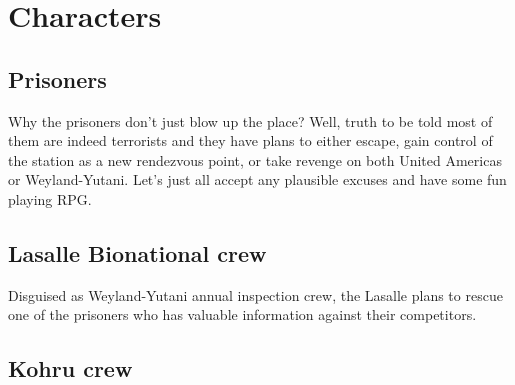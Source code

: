 \chapter{Characters}


\section{Prisoners}


Why the prisoners don't just blow up the place? Well, truth to be told most of them are indeed terrorists and they have plans to either escape, gain control of the station as a new rendezvous point, or take revenge on both United Americas or  Weyland-Yutani. Let's just all accept any plausible excuses and have some fun playing RPG. 




\clearpage


\section{Lasalle Bionational crew}

Disguised as Weyland-Yutani annual inspection crew, the Lasalle plans to rescue one of the prisoners who has valuable information against their competitors.



\clearpage




\section{Kohru crew}











